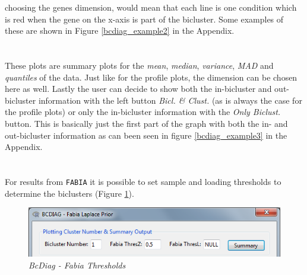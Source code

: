 \documentclass[a4paper]{article}\usepackage[]{graphicx}\usepackage[]{color}
\begin{document}
choosing the genes dimension, would mean that each line is one condition which
is red when the gene on the x-axis is part of the bicluster. Some examples of these
are shown in Figure \ref{bcdiag_example2} in the Appendix.
\\ \\
\\
These plots are summary plots for the {\it mean}, {\it median}, {\it variance},
{\it MAD} and {\it quantiles} of the data. Just like for the profile plots, the
dimension can be chosen here as well. Lastly the user can decide to show both
the in-bicluster and out-bicluster information with the left button {\it Bicl. \& Clust.} (as is
always the case for the profile plots) or only the in-bicluster information with
the {\it Only Biclust.} button. This is basically just the first part of the graph
with both the in- and out-bicluster information as can been seen in figure
\ref{bcdiag_example3} in the Appendix.
\\ \\
\\
For results from \verb|FABIA| it is possible to set sample and loading
thresholds to determine the biclusters (Figure \ref{bcdiag_fabia}).
\begin{figure}[H]
\centering
\includegraphics[scale=0.5]{figures/bcdiag_fabia.png}
\caption{{\it BcDiag - Fabia Thresholds}\label{bcdiag_fabia}}
\end{figure}
\end{document}
